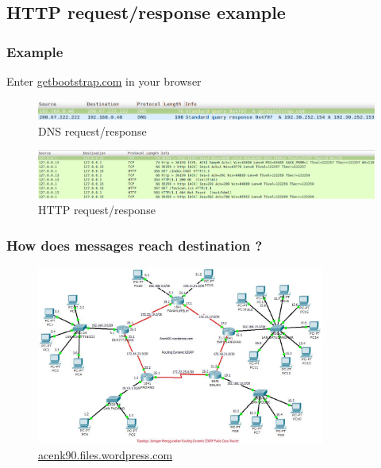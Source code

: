 \subsection{HTTP request/response example}
\begin{frame}
    \frametitle{Example}
      Enter \color{blue}\href{http://getbootstrap.com}{getbootstrap.com} \color{black} in your browser\pause
      \begin{figure}
	  \includegraphics[width=11.5cm]{./imgs/dns-req.png}
	\caption{DNS request/response}
      \end{figure}
      \pause
      \begin{figure}
	  \includegraphics[width=13cm]{./imgs/http-req.png}
	\caption{HTTP request/response}
      \end{figure}
  \end{frame}
    \begin{frame}
    \frametitle{How does messages reach destination ?}
      \begin{figure}
	  \includegraphics[width=9.5cm]{./imgs/routing.jpg}
	\caption{\color{blue}\href{http://acenk90.files.wordpress.com}{acenk90.files.wordpress.com}}
	\label{fig:routing}
      \end{figure}
  \end{frame}


